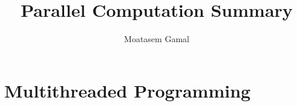 \documentclass[12pt, a4paper]{book}
\title{Parallel Computation Summary}
\author{Moatasem Gamal}
\affil{FCAI BSU}
\begin{document}
\maketitle
\tableofcontents
\chapter{Multithreaded Programming}
\end{document}
